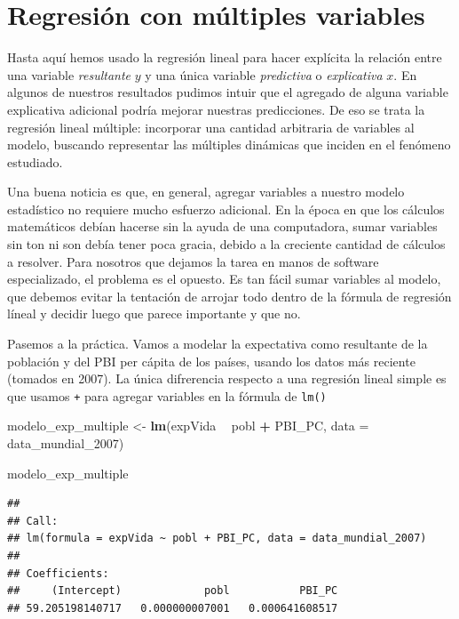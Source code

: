 \documentclass[]{book}
\newenvironment{Shaded}{\begin{snugshade}}{\end{snugshade}}
\newcommand{\KeywordTok}[1]{\textcolor[rgb]{0.13,0.29,0.53}{\textbf{#1}}}
\newcommand{\DataTypeTok}[1]{\textcolor[rgb]{0.13,0.29,0.53}{#1}}
\newcommand{\DecValTok}[1]{\textcolor[rgb]{0.00,0.00,0.81}{#1}}
\newcommand{\StringTok}[1]{\textcolor[rgb]{0.31,0.60,0.02}{#1}}
\newcommand{\OperatorTok}[1]{\textcolor[rgb]{0.81,0.36,0.00}{\textbf{#1}}}
\newcommand{\NormalTok}[1]{#1}
\begin{document}
\section{Regresión con múltiples
variables}\label{regresion-con-multiples-variables}

Hasta aquí hemos usado la regresión lineal para hacer explícita la
relación entre una variable \emph{resultante} \(y\) y una única variable
\emph{predictiva} o \emph{explicativa} \(x\). En algunos de nuestros
resultados pudimos intuir que el agregado de alguna variable explicativa
adicional podría mejorar nuestras predicciones. De eso se trata la
regresión lineal múltiple: incorporar una cantidad arbitraria de
variables al modelo, buscando representar las múltiples dinámicas que
inciden en el fenómeno estudiado.

Una buena noticia es que, en general, agregar variables a nuestro modelo
estadístico no requiere mucho esfuerzo adicional. En la época en que los
cálculos matemáticos debían hacerse sin la ayuda de una computadora,
sumar variables sin ton ni son debía tener poca gracia, debido a la
creciente cantidad de cálculos a resolver. Para nosotros que dejamos la
tarea en manos de software especializado, el problema es el opuesto. Es
tan fácil sumar variables al modelo, que debemos evitar la tentación de
arrojar todo dentro de la fórmula de regresión líneal y decidir luego
que parece importante y que no.

Pasemos a la práctica. Vamos a modelar la expectativa como resultante de
la población y del PBI per cápita de los países, usando los datos más
reciente (tomados en 2007). La única difrerencia respecto a una
regresión lineal simple es que usamos \texttt{+} para agregar variables
en la fórmula de \texttt{lm()}

\begin{Shaded}
\begin{Highlighting}[]
\NormalTok{modelo_exp_multiple <-}\StringTok{ }\KeywordTok{lm}\NormalTok{(expVida }\OperatorTok{~}\StringTok{ }\NormalTok{pobl }\OperatorTok{+}\StringTok{ }\NormalTok{PBI_PC, }\DataTypeTok{data =}\NormalTok{ data_mundial_}\DecValTok{2007}\NormalTok{)}

\NormalTok{modelo_exp_multiple}
\end{Highlighting}
\end{Shaded}

\begin{verbatim}
## 
## Call:
## lm(formula = expVida ~ pobl + PBI_PC, data = data_mundial_2007)
## 
## Coefficients:
##     (Intercept)             pobl           PBI_PC  
## 59.205198140717   0.000000007001   0.000641608517
\end{verbatim}
\end{document}
